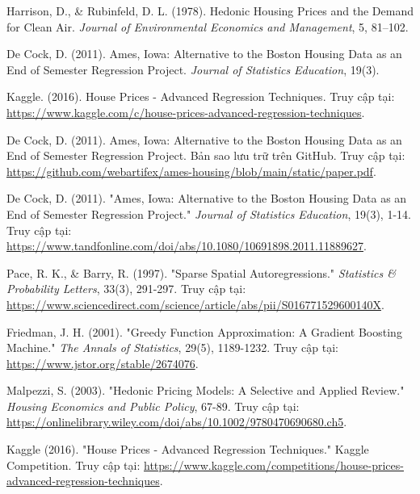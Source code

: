 \documentclass{article}
\begin{document}
\begin{thebibliography}{9}

Harrison, D., \& Rubinfeld, D. L. (1978). Hedonic Housing Prices and the Demand for Clean Air. \textit{Journal of Environmental Economics and Management}, 5, 81--102.

De Cock, D. (2011). Ames, Iowa: Alternative to the Boston Housing Data as an End of Semester Regression Project. \textit{Journal of Statistics Education}, 19(3).

Kaggle. (2016). House Prices - Advanced Regression Techniques. Truy cập tại: \url{https://www.kaggle.com/c/house-prices-advanced-regression-techniques}.

De Cock, D. (2011). Ames, Iowa: Alternative to the Boston Housing Data as an End of Semester Regression Project. Bản sao lưu trữ trên GitHub. Truy cập tại: \url{https://github.com/webartifex/ames-housing/blob/main/static/paper.pdf}.

De Cock, D. (2011). "Ames, Iowa: Alternative to the Boston Housing Data as an End of Semester Regression Project." \textit{Journal of Statistics Education}, 19(3), 1-14. Truy cập tại: \url{https://www.tandfonline.com/doi/abs/10.1080/10691898.2011.11889627}.

Pace, R. K., \& Barry, R. (1997). "Sparse Spatial Autoregressions." \textit{Statistics \& Probability Letters}, 33(3), 291-297. Truy cập tại: \url{https://www.sciencedirect.com/science/article/abs/pii/S016771529600140X}.

Friedman, J. H. (2001). "Greedy Function Approximation: A Gradient Boosting Machine." \textit{The Annals of Statistics}, 29(5), 1189-1232. Truy cập tại: \url{https://www.jstor.org/stable/2674076}.

Malpezzi, S. (2003). "Hedonic Pricing Models: A Selective and Applied Review." \textit{Housing Economics and Public Policy}, 67-89. Truy cập tại: \url{https://onlinelibrary.wiley.com/doi/abs/10.1002/9780470690680.ch5}.

Kaggle (2016). "House Prices - Advanced Regression Techniques." Kaggle Competition. Truy cập tại: \url{https://www.kaggle.com/competitions/house-prices-advanced-regression-techniques}.

\end{thebibliography}
\end{document}
